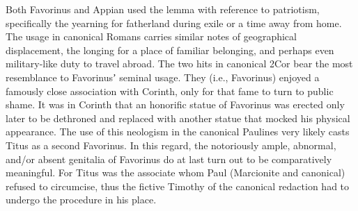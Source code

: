 Both Favorinus and Appian used the lemma with reference to patriotism, %
specifically the yearning for fatherland during exile or a time away from home. %
The usage in canonical Romans carries similar notes of geographical displacement, %
the longing for a place of familiar belonging, %
and perhaps even military-like duty to travel abroad. %
The two hits in canonical 2Cor %
bear the most resemblance to Favorinusʼ seminal usage. %
They (i.e., Favorinus) enjoyed a famously close association with Corinth, %
only for that fame to turn to public shame. %
It was in Corinth that an honorific statue of Favorinus was erected only later to be dethroned %
and replaced with another statue that mocked his physical appearance. %
The use of this neologism in the canonical Paulines %
very likely casts Titus as a second Favorinus. %
In this regard, the notoriously ample, abnormal, and/or absent genitalia of Favorinus %
do at last turn out to be comparatively meaningful. %
For Titus was the associate whom Paul (Marcionite and canonical) refused to circumcise, %
thus the fictive Timothy of the canonical redaction had to undergo the procedure in his place. %